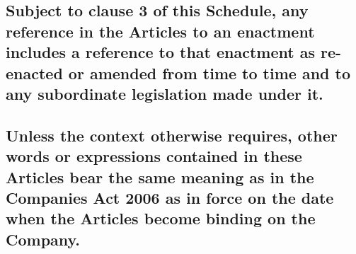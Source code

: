 \documentclass[12pt]{article}
\begin{document}
\subsection{\mdseries\normalsize{Subject to clause 3 of this Schedule, any reference in the Articles to an enactment includes a reference to that enactment as re-enacted or amended from time to time and to any subordinate legislation made under it.}}
\subsection{\mdseries\normalsize{Unless the context otherwise requires, other words or expressions contained in these Articles bear the same meaning as in the Companies Act 2006 as in force on the date when the Articles become binding on the Company.}}
\end{document}
